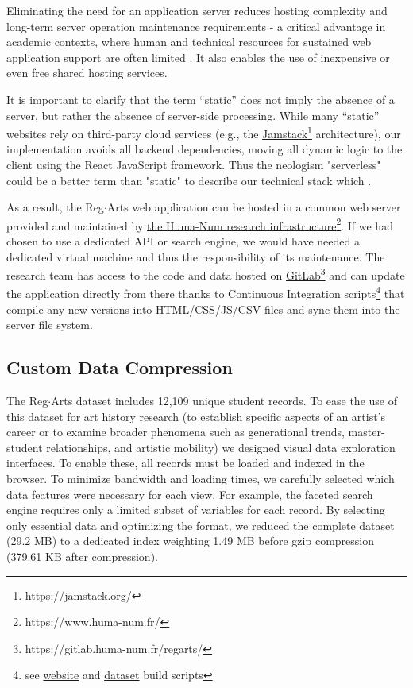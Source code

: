 \documentclass[final]{anthology-ch} %
\begin{document}
Eliminating the need for an application server reduces hosting complexity and long-term server operation maintenance requirements - a critical advantage in academic contexts, where human and technical resources for sustained web application support are often limited \cite{wikle_static_2025}. It also enables the use of inexpensive or even free shared hosting services.  

It is important to clarify that the term “static” does not imply the absence of a server, but rather the absence of server-side processing. While many “static” websites rely on third-party cloud services (e.g., the \href{https://jamstack.org/}{Jamstack}\footnote{https://jamstack.org/} architecture), our implementation avoids all backend dependencies, moving all dynamic logic to the client using the React JavaScript framework. Thus the neologism "serverless" could be a better term than "static" to describe our technical stack which .

As a result, the Reg$\cdot$Arts web application can be hosted in a common web server provided and maintained by \href{https://www.huma-num.fr/}{the Huma-Num research infrastructure}\footnote{https://www.huma-num.fr/}. If we had chosen to use a dedicated API or search engine, we would have needed a dedicated virtual machine and thus the responsibility of its maintenance. The research team has access to the code and data hosted on \href{https://gitlab.huma-num.fr/regarts/}{GitLab}\footnote{https://gitlab.huma-num.fr/regarts/} and can update the application directly from there thanks to Continuous Integration scripts\footnote{see \href{https://gitlab.huma-num.fr/regarts/website/-/blob/main/.gitlab-ci.yml}{website} and \href{https://gitlab.huma-num.fr/regarts/corpus/-/blob/main/.gitlab-ci.yml}{dataset} build scripts} that compile any new versions into HTML/CSS/JS/CSV files and sync them into the server file system. 

\subsection{Custom Data Compression}
The Reg$\cdot$Arts dataset includes 12,109 unique student records. To ease the use of this dataset for art history research (to establish specific aspects of an artist’s career or to examine broader phenomena such as generational trends, master-student relationships, and artistic mobility) we designed visual data exploration interfaces. To enable these, all records must be loaded and indexed in the browser. To minimize bandwidth and loading times, we carefully selected which data features were necessary for each view. For example, the faceted search engine requires only a limited subset of variables for each record. By selecting only essential data and optimizing the format, we reduced the complete dataset (29.2 MB) to a dedicated index weighting 1.49 MB before gzip compression (379.61 KB after compression).
\end{document}
